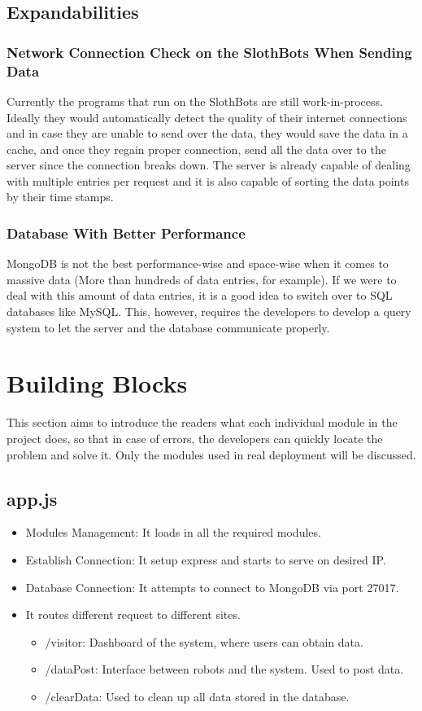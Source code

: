 \documentclass{article}
\begin{document}
\subsection{Expandabilities}
\subsubsection{Network Connection Check on the SlothBots When Sending Data} Currently the programs that run on the SlothBots are still work-in-process. Ideally they would automatically detect the quality of 
their internet connections and in case they are unable to send over the data, they would save the data in a cache, and once they regain proper connection, send all the data 
over to the server since the connection breaks down. The server is already capable of dealing with multiple entries per request and it is also capable of sorting the data points
by their time stamps.
\subsubsection{Database With Better Performance} MongoDB is not the best performance-wise and space-wise when it comes to massive data (More than hundreds of data entries, for example). If we were to deal with this 
amount of data entries, it is a good idea to switch over to SQL databases like MySQL. This, however, requires the developers to develop a query system to let the server and the database communicate properly.



\newpage
\section{Building Blocks}
This section aims to introduce the readers what each individual module in the project does, so that in case of errors, the developers can quickly 
locate the problem and solve it. Only the modules used in real deployment will be discussed.
\subsection{app.js}
\begin{itemize}
  \item Modules Management: It loads in all the required modules.
  \item Establish Connection: It setup express and starts to serve on desired IP.
  \item Database Connection: It attempts to connect to MongoDB via port 27017.
  \item It routes different request to different sites.
  \begin{itemize}
    \item /visitor: Dashboard of the system, where users can obtain data.
    \item /dataPost: Interface between robots and the system. Used to post data.
    \item /clearData: Used to clean up all data stored in the database. 
  \end{itemize}
\end{itemize}
\end{document}
